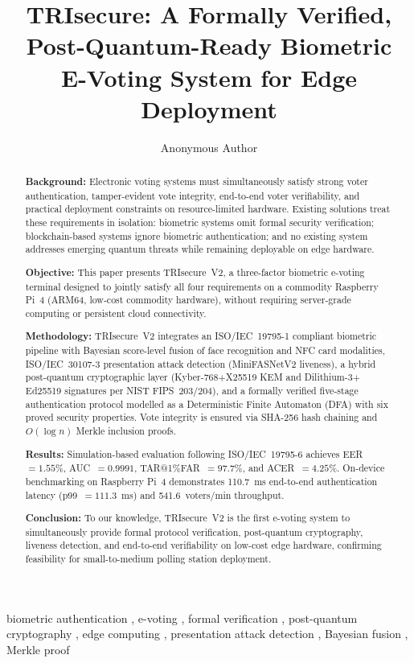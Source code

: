 \documentclass[preprint,12pt]{elsarticle}
\begin{document}
\begin{frontmatter}

\title{TRIsecure: A Formally Verified, Post-Quantum-Ready Biometric\\
       E-Voting System for Edge Deployment}

\author[1]{Anonymous Author}
\address[1]{Anonymous Institution}

\begin{abstract}
\noindent\textbf{Background:} Electronic voting systems must simultaneously
satisfy strong voter authentication, tamper-evident vote integrity, end-to-end
voter verifiability, and practical deployment constraints on resource-limited
hardware. Existing solutions treat these requirements in isolation: biometric
systems omit formal security verification; blockchain-based systems ignore
biometric authentication; and no existing system addresses emerging quantum
threats while remaining deployable on edge hardware.

\noindent\textbf{Objective:} This paper presents TRIsecure~V2, a three-factor
biometric e-voting terminal designed to jointly satisfy all four requirements on
a commodity Raspberry Pi~4 (ARM64, low-cost commodity hardware), without requiring
server-grade computing or persistent cloud connectivity.

\noindent\textbf{Methodology:} TRIsecure~V2 integrates an ISO/IEC~19795-1
compliant biometric pipeline with Bayesian score-level fusion of face recognition
and NFC card modalities, ISO/IEC~30107-3 presentation attack detection
(MiniFASNetV2 liveness), a hybrid post-quantum cryptographic layer
(Kyber-768$+$X25519 KEM and Dilithium-3$+$Ed25519 signatures per NIST
FIPS~203/204), and a formally verified five-stage authentication protocol
modelled as a Deterministic Finite Automaton (DFA) with six proved security
properties. Vote integrity is ensured via SHA-256 hash chaining and $O(\log n)$
Merkle inclusion proofs.

\noindent\textbf{Results:} Simulation-based evaluation following ISO/IEC~19795-6
achieves EER~$=1.55\%$, AUC~$=0.9991$, TAR@1\%FAR~$=97.7\%$, and
ACER~$=4.25\%$. On-device benchmarking on Raspberry Pi~4 demonstrates
110.7~ms end-to-end authentication latency (p99~$=111.3$~ms) and
541.6~voters/min throughput.

\noindent\textbf{Conclusion:} To our knowledge, TRIsecure~V2 is the first e-voting system to
simultaneously provide formal protocol verification, post-quantum cryptography,
liveness detection, and end-to-end verifiability on low-cost edge hardware,
confirming feasibility for small-to-medium polling station deployment.
\end{abstract}

\begin{keyword}
biometric authentication \sep
e-voting \sep
formal verification \sep
post-quantum cryptography \sep
edge computing \sep
presentation attack detection \sep
Bayesian fusion \sep
Merkle proof
\end{keyword}

\end{frontmatter}
\end{document}
